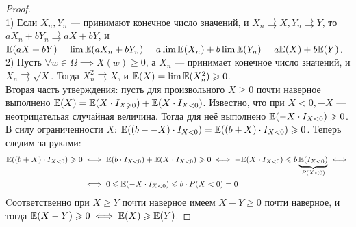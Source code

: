 \begin{proof}
    ~\\
    1) Если $X_n, Y_n$ --- принимают конечное число значений, и $X_n \rightrightarrows X, Y_n \rightrightarrows Y$, то
    $aX_n + bY_n \rightrightarrows aX + bY$, и $\mathbb{E}(aX + bY) = \lim \mathbb{E}(aX_n + bY_n) = a\lim \mathbb{E}(X_n) + b\lim \mathbb{E}(Y_n) =
    a\mathbb{E}(X) + b\mathbb{E}(Y)$.\\
    2) Пусть $\forall w \in \Omega \implies X(w) \geq 0$, а $X_n$ --- принимает конечное число значений,
    и $X_n \rightrightarrows \sqrt{X}$. Тогда $X_n^2 \rightrightarrows X$, и $\mathbb{E}(X) = \lim \mathbb{E}(X_n^2) \geqslant 0$.\\
    Вторая часть утверждения: пусть для произвольного $X \geq 0$ почти наверное выполнено
    $\mathbb{E}(X) = \mathbb{E}(X \cdot I_{X \geqslant 0}) + \mathbb{E}(X \cdot I_{X < 0})$. Известно, что при $X < 0, -X$ --- неотрицательая
    случайная величина. Тогда для неё выполнено $\mathbb{E}(-X \cdot I_{X < 0}) \geqslant 0$. В силу ограниченности $X$:
    $\mathbb{E}((b - -X) \cdot I_{X < 0}) = \mathbb{E}((b + X) \cdot I_{X < 0}) \geqslant 0$. Теперь следим за руками:
    \begin{align*}
        \mathbb{E}((b + X) \cdot I_{X < 0}) \geqslant 0
        &\iff
        \mathbb{E}(b \cdot I_{X < 0}) + \mathbb{E}(X \cdot I_{X < 0}) \geqslant 0
        \iff
        -\mathbb{E}(X \cdot I_{X < 0}) \leqslant b\underbrace{\mathbb{E}(I_{X < 0})}_{P(X < 0)}
        \iff\\
        &\iff
        0 \leqslant \mathbb{E}(-X \cdot I_{X < 0}) \leqslant b \cdot P(X < 0) = 0
    \end{align*}
    Cоответственно при $X \geq Y$ почти наверное имеем $X - Y \geq 0$ почти наверное, и тогда
    $\mathbb{E}(X - Y) \geqslant 0 \iff \mathbb{E}(X) \geqslant \mathbb{E}(Y)$.
\end{proof}
